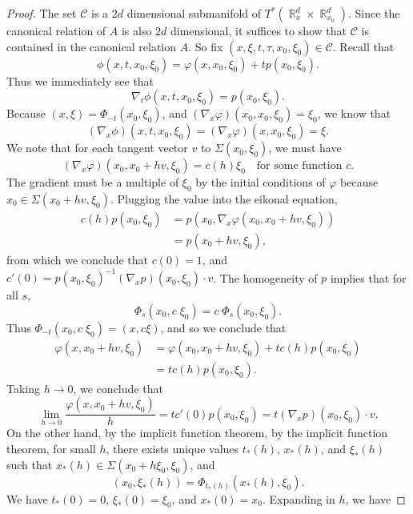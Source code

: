 \documentclass{article}
\theoremstyle{plain}
\theoremstyle{remark}
\theoremstyle{definition}
\DeclareMathOperator{\RR}{\mathbb{R}}
\begin{document}
\begin{proof}
	The set $\mathcal{C}$ is a $2d$ dimensional submanifold of $T^*(\RR^d_x \times \RR^d_{x_0})$. Since the canonical relation of $A$ is also $2d$ dimensional, it suffices to show that $\mathcal{C}$ is contained in the canonical relation $A$. So fix $(x,\xi,t,\tau,x_0,\xi_0) \in \mathcal{C}$. Recall that
	\[ \phi(x,t,x_0,\xi_0) = \varphi(x,x_0,\xi_0) + t p(x_0,\xi_0). \]
	Thus we immediately see that
	\begin{equation} \label{equationtime}
		\nabla_t \phi(x,t,x_0,\xi_0) = p(x_0,\xi_0).
	\end{equation}
	Because $(x,\xi) = \Phi_{-t}(x_0,\xi_0)$, and $(\nabla_x \varphi)(x_0,x_0,\xi_0) = \xi_0$, we know that
	\begin{equation} \label{equationtwotime}
		(\nabla_x \phi)(x,t,x_0,\xi_0) = (\nabla_x \varphi)(x,x_0,\xi_0) = \xi.
	\end{equation}
	We note that for each tangent vector $v$ to $\Sigma(x_0,\xi_0)$, we must have
	\[ (\nabla_x \varphi)(x_0, x_0 + h v, \xi_0) = c(h) \xi_0 \quad\text{for some function $c$}. \]
	The gradient must be a multiple of $\xi_0$ by the initial conditions of $\varphi$ because $x_0 \in \Sigma(x_0 + hv, \xi_0)$. Plugging the value into the eikonal equation,
	\begin{align*}
		c(h) p(x_0,\xi_0) &= p( x_0, \nabla_x \varphi(x_0, x_0 + hv, \xi_0) )\\
		&= p(x_0 + hv, \xi_0),
	\end{align*}
	from which we conclude that $c(0) = 1$, and $c'(0) = p(x_0,\xi_0)^{-1} (\nabla_x p)(x_0,\xi_0) \cdot v$. The homogeneity of $p$ implies that for all $s$,
	\[ \Phi_s( x_0, c\; \xi_0 ) = c\; \Phi_s(x_0, \xi_0). \]
	Thus $\Phi_{-t}(x_0, c\; \xi_0) = (x, c \xi)$, and so we conclude that
	\begin{align*}
		\varphi(x, x_0 + hv, \xi_0) &= \varphi(x_0, x_0 + hv, \xi_0) + t c(h) p( x_0, \xi_0 )\\
		&= t c(h) p(x_0, \xi_0).
	\end{align*}
	Taking $h \to 0$, we conclude that
	\[ \lim_{h \to 0} \frac{\varphi(x, x_0 + hv, \xi_0)}{h} = t c'(0) p(x_0,\xi_0) = t (\nabla_x p)(x_0,\xi_0) \cdot v. \]
	On the other hand, by the implicit function theorem, by the implicit function theorem, for small $h$, there exists unique values $t_*(h)$, $x_*(h)$, and $\xi_*(h)$ such that $x_*(h) \in \Sigma(x_0 + h \xi_0, \xi_0)$, and
	\[ (x_0 , \xi_*(h) ) = \Phi_{t_*(h)} ( x_*(h), \xi_0 ). \]
	We have $t_*(0) = 0$, $\xi_*(0) = \xi_0$, and $x_*(0) = x_0$. Expanding in $h$, we have

\end{proof}
\end{document}
